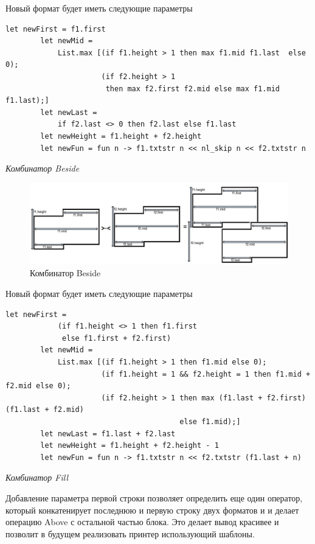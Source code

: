 \documentclass{matmex-diploma}
\begin{document}
Новый формат будет иметь следующие параметры
\begin{lstlisting}
let newFirst = f1.first
        let newMid = 
            List.max [(if f1.height > 1 then max f1.mid f1.last  else 0); 
                      (if f2.height > 1 
                       then max f2.first f2.mid else max f1.mid f1.last);]
        let newLast = 
            if f2.last <> 0 then f2.last else f1.last
        let newHeight = f1.height + f2.height
        let newFun = fun n -> f1.txtstr n << nl_skip n << f2.txtstr n
\end{lstlisting}

\textit{Комбинатор Beside}

\begin{figure}[h]
    \centering
	\includegraphics[scale=0.5]{Images/image07.png}
	\caption{Комбинатор Beside}
\end{figure}
\newpage

Новый формат будет иметь следующие параметры

\begin{lstlisting}
let newFirst = 
            (if f1.height <> 1 then f1.first
             else f1.first + f2.first)
        let newMid = 
            List.max [(if f1.height > 1 then f1.mid else 0); 
                      (if f1.height = 1 && f2.height = 1 then f1.mid + f2.mid else 0);
                      (if f2.height > 1 then max (f1.last + f2.first) (f1.last + f2.mid) 
                                        else f1.mid);]
        let newLast = f1.last + f2.last
        let newHeight = f1.height + f2.height - 1
        let newFun = fun n -> f1.txtstr n << f2.txtstr (f1.last + n)
\end{lstlisting}

\textit{Комбинатор Fill}

Добавление параметра первой строки позволяет определить еще один оператор, который конкатенирует последнюю и первую строку двух форматов и и делает операцию Above с остальной частью блока. Это делает вывод красивее и позволит в будущем реализовать принтер использующий шаблоны. 
\end{document}
